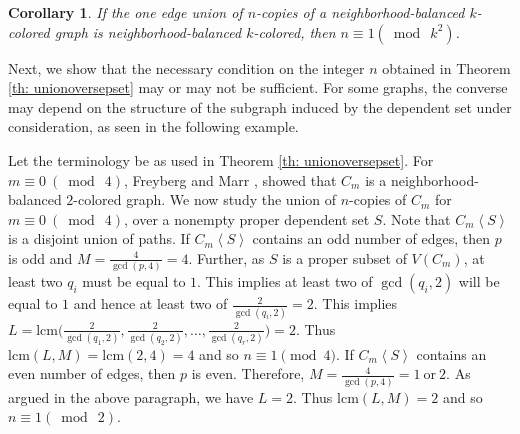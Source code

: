 \documentclass[12pt]{article}
\newtheorem{corollary}[theorem]{Corollary}
\newcommand{\nbcd}{neighborhood-balanced $k$-colored\xspace}
\begin{document}
\begin{corollary}
If the one edge union of $n$-copies of a \nbcd graph is \nbcd, then $n\equiv 1 (\bmod\ k^2)$. 
\end{corollary}

Next, we show that the necessary condition on the integer $n$ obtained in Theorem \ref{th: unionoversepset} may or may not be sufficient.
For some graphs, the converse may depend on the structure of the subgraph induced by the dependent set under consideration, as seen in the following example.\par
Let the terminology be as used in Theorem \ref{th: unionoversepset}.
For $m\equiv 0\ (\bmod\ 4)$, Freyberg and Marr \cite{nbc}, showed that $C_m$ is a neighborhood-balanced $2$-colored graph.
We now study the union of $n$-copies of $C_m$ for $m \equiv 0\ (\bmod\ 4)$, over a nonempty proper dependent set $S$.
Note that $C_m\left< S \right>$ is a disjoint union of paths.
If $C_m\left< S \right>$ contains an odd number of edges, then $p$ is odd and $M=\frac{4}{\gcd(p,4)}=4$.
Further, as $S$ is a proper subset of $V(C_m)$, at least two $q_i$ must be equal to $1$.
This implies at least two of $\gcd(q_i,2)$ will be equal to $1$ and hence at least two of $\frac{2}{\gcd(q_i,2)}=2$.
This implies $L=\mathrm{lcm}\big(\frac{2}{\gcd(q_1,2)}, \frac{2}{\gcd(q_2,2)}, \dots, \frac{2}{\gcd(q_r,2)}\big)=2$.
Thus $\mathrm{lcm}(L,M) = \mathrm{lcm}(2,4)=4$ and so $n \equiv 1 \pmod{4}$.
If $C_m\left< S \right>$ contains an even number of edges, then $p$ is even. 
Therefore, $M=\frac{4}{\gcd(p,4)}=1\ \text{or}\ 2$.
As argued in the above paragraph, we have $L = 2$.
Thus $\mathrm{lcm}(L,M)=2$ and so $n\equiv 1 (\bmod\ 2)$.\\
\end{document}
